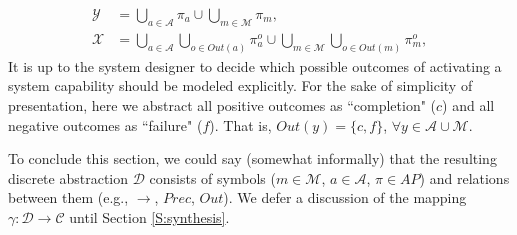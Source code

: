 \begin{subequations}
	\label{ActOutAP}
	\begin{align}
		\mathcal{Y} &= \bigcup \limits_{a \in \mathcal{A}} \pi_a \cup \bigcup \limits_{m \in \mathcal{M}} \pi_m,\\
		\mathcal{X} &= 
		\bigcup \limits_{a \in \mathcal{A}} \bigcup \limits_{o \in Out(a)} \pi_a^o \cup \bigcup \limits_{m \in \mathcal{M}} \bigcup \limits_{o \in Out(m)} \pi_m^o,
	\end{align}
\end{subequations}
It is up to the system designer to decide which possible outcomes of activating a system capability should be modeled explicitly.
For the sake of simplicity of presentation, here we abstract all positive outcomes as ``completion" ($c$) and all negative outcomes as ``failure" ($f$). 
That is, $Out(y) = \{ c, f \}$, $\forall y \in \mathcal{A} \cup \mathcal{M}$.

To conclude this section, we could say (somewhat informally) that the resulting discrete abstraction $\mathcal{D}$ consists of symbols ($m \in \mathcal{M}$, $a \in \mathcal{A}$, $\pi \in AP$) and relations between them (e.g., $\boldsymbol\rightarrow$, $Prec$, $Out$).
We defer a discussion of the mapping $\gamma: \mathcal{D} \rightarrow \mathcal{C}$ until Section \ref{S:synthesis}.


